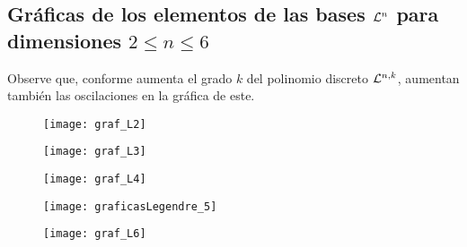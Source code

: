  

 
 
\subsection{Gráficas de los elementos de las bases $\mathcal{L}^{n}$ para dimensiones $2 \leq n \leq 6 $}

Observe que, conforme aumenta el grado $k$ del 
polinomio discreto $\mathcal{L}^{n,k}$, aumentan
también las oscilaciones en la gráfica de este.

\begin{figure}[H]
	\centering
	\texttt{[image: graf\_L2]}
\end{figure}


\begin{figure}[H]
	\centering
	\texttt{[image: graf\_L3]}
\end{figure}


\begin{figure}[H]
	\centering
	\texttt{[image: graf\_L4]}
\end{figure}

\begin{figure}[H]
	\centering
	\texttt{[image: graficasLegendre\_5]}
\end{figure}

\begin{figure}[H]
	\centering
	\texttt{[image: graf\_L6]}
\end{figure}

